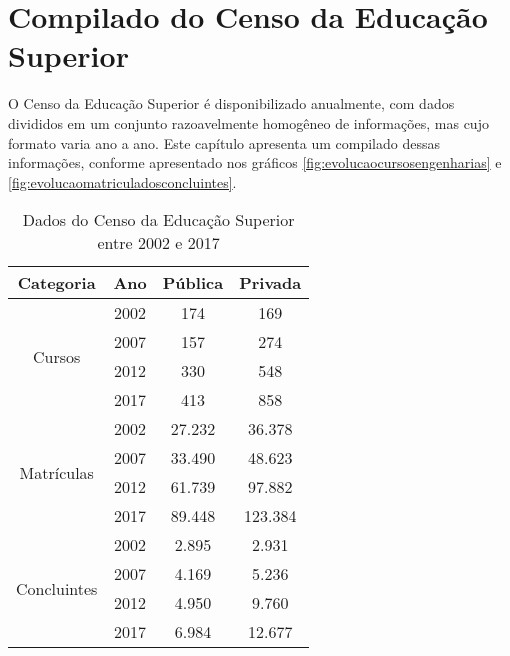 \documentclass[grad,numbers]{coppe}
\begin{document}
\mainmatter

 
 



%  
  


\backmatter



\appendix
\chapter{Compilado do Censo da Educação Superior}

	O Censo da Educação Superior é disponibilizado anualmente, com dados divididos em um conjunto razoavelmente homogêneo de informações, mas cujo formato varia ano a ano. Este capítulo apresenta um compilado dessas informações, conforme apresentado nos gráficos \ref{fig:evolucaocursosengenharias} e \ref{fig:evolucaomatriculadosconcluintes}.
	
	\begin{table}[h!]
		\centering
		\caption{Dados do Censo da Educação Superior entre 2002 e 2017}
		\label{tab:dadosCenso}
		\begin{tabular}{|c|c||c|c||}
			\hline
			Categoria                      & Ano  & Pública & Privada \\ \hline
			\multirow{4}{*}{Cursos}        & 2002 &   174   &   169   \\
			                               & 2007 &   157   &   274   \\
			                               & 2012 &   330   &   548   \\
			                               & 2017 &   413   &   858   \\ \hline
			\multirow{4}{*}{Matrículas}    & 2002 & 27.232  & 36.378  \\
			                               & 2007 & 33.490  & 48.623  \\
			                               & 2012 & 61.739  & 97.882  \\
			                               & 2017 & 89.448  & 123.384 \\ \hline
			\multirow{4}{*}{Concluintes}   & 2002 &  2.895  &  2.931  \\
			                               & 2007 &  4.169  &  5.236  \\
			                               & 2012 &  4.950  &  9.760  \\
			                               & 2017 &  6.984  & 12.677  \\ \hline
		\end{tabular}
	\end{table}
\end{document}
